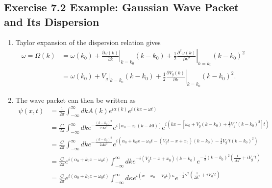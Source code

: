 \documentclass[10pt,a4paper]{book}
\theoremstyle{definition}
\begin{document}
\subsection{Exercise 7.2 Example: Gaussian Wave Packet and Its Dispersion}
\begin{enumerate}[label=(\alph*)]
\item Taylor expansion of the dispersion relation gives
\begin{align}
    \omega=\Omega(k)&=\omega(k_0)+\left.\frac{\partial \omega(k)}{\partial k}\right|_{k=k_0}(k-k_0)+\frac{1}{2}\left.\frac{\partial^2\omega(k)}{\partial k^2}\right|_{k=k_0}(k-k_0)^2\\
    &=\omega(k_0)+V_g|_{k=k_0}(k-k_0)+\frac{1}{2}\left.\frac{\partial V_g(k)}{\partial k}\right|_{k=k_0}(k-k_0)^2.
\end{align}
\item The wave packet can then be written as
\begin{align}
   \psi(x,t)
   &=\frac{1}{2\pi}\int_{-\infty}^\infty dk A(k)e^{i\alpha(k)}e^{i(kx-\omega t)}\\
   &=\frac{C}{2\pi}\int_{-\infty}^\infty dk e^{-\frac{(k-k_0)^2}{2\Delta k^2}}e^{i[\alpha_0-x_0(k-k0)]}e^{i(kx-[\omega_0+V_g(k-k_0)+\frac{1}{2}V_g'(k-k_0)^2] t)}\\
   &=\frac{C}{2\pi}\int_{-\infty}^\infty dk e^{-\frac{(k-k_0)^2}{2\Delta k^2}}e^{i(\alpha_0+k_0x-\omega_0t-(V_gt-x+x_0)(k-k_0)-\frac{1}{2}V_g't (k-k_0)^2)}\\
   &=\frac{C}{2\pi}e^{i(\alpha_0+k_0x-\omega_0t)}\int_{-\infty}^\infty dk e^{-i(V_gt-x+x_0)(k-k_0)} e^{-\frac{1}{2}(k-k_0)^2\left(\frac{1}{\Delta k^2}+iV_g't\right)}\\
   &=\frac{C}{2\pi}e^{i(\alpha_0+k_0x-\omega_0t)}\int_{-\infty}^\infty d\kappa e^{i(x-x_0-V_gt)\kappa} e^{-\frac{1}{2}\kappa^2\left(\frac{1}{\Delta k^2}+iV_g't\right)}\\
\end{align}


\end{enumerate}
\end{document}
